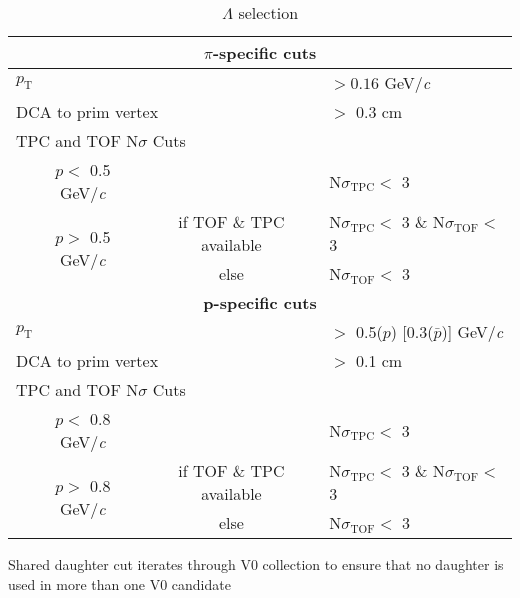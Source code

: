\documentclass[ALICE,manyauthors]{cernphprep}
\begin{document}
\begin{table}[htbp]
\begin{tabular}{lc|c|l}
   
   \multicolumn{4}{c}{\textbf{$\pi$-specific cuts}} \\
   \hline
   \multicolumn{3}{l|}{$p_{\mathrm{T}}$} & $> 0.16$ GeV/\textit{c} \\
   \hline
   \multicolumn{3}{l|}{DCA to prim vertex} & $>$ 0.3 cm \\
   \hline
   \multicolumn{4}{l}{TPC and TOF N$\sigma$ Cuts} \\
   \hline
    & \multicolumn{1}{c}{$p <$ 0.5 GeV/\textit{c}} &  & N$\sigma_{\mathrm{TPC}} <$ 3 \\
   \hline
    & \multirow{2}{*}{$p >$ 0.5 GeV/\textit{c}} &  if TOF \& TPC available & N$\sigma_{\mathrm{TPC}} <$ 3 \& N$\sigma_{\mathrm{TOF}} <$ 3 \\
   \cline{3-4}
    & & else & N$\sigma_{\mathrm{TOF}} <$ 3 \\
   \hline
   
   
   \multicolumn{4}{c}{\textbf{p-specific cuts}} \\
   \hline
   \multicolumn{3}{l|}{$p_{\mathrm{T}}$} & $ > $ 0.5($p$) [0.3($\bar{p}$)] GeV/\textit{c} \\
   \hline
   \multicolumn{3}{l|}{DCA to prim vertex} & $>$ 0.1 cm \\
   \hline
   \multicolumn{4}{l}{TPC and TOF N$\sigma$ Cuts} \\
   \hline
    & \multicolumn{1}{c}{$p <$ 0.8 GeV/\textit{c}} & & N$\sigma_{\mathrm{TPC}} <$ 3 \\
   \hline
    & \multirow{2}{*}{$p >$ 0.8 GeV/\textit{c}} &  if TOF \& TPC available & N$\sigma_{\mathrm{TPC}} <$ 3 \& N$\sigma_{\mathrm{TOF}} <$ 3 \\
   \cline{3-4}
    & & else & N$\sigma_{\mathrm{TOF}} <$ 3 \\
   \hline   
  \end{tabular}
 \caption{$\Lambda$ selection}
 \label{tab:LamCuts} 
\end{table}


Shared daughter cut iterates through V0 collection to ensure that no daughter is used in more than one V0 candidate
\end{document}
